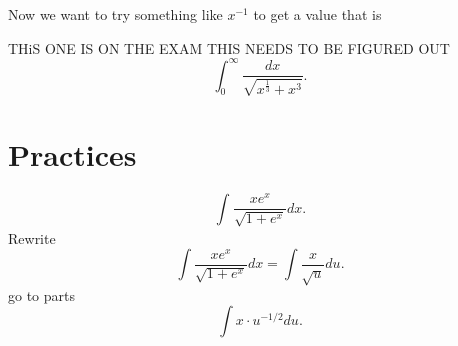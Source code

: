 \documentclass[a4paper]{article}
\begin{document}
Now we want to try something like $x^{-1}$ to get a value that is 

THiS ONE IS ON THE EXAM THIS NEEDS TO BE FIGURED OUT 
\[
\int_{0}^{\infty} \frac{dx}{\sqrt{x^{\frac{1}{3}}+x^3}}
.\] 

\section{Practices}%
\label{sec:Practices}
\[
\int_{}^{} \frac{xe^{x}}{\sqrt{1+e^{x}}}dx
.\] 
Rewrite 
\[
\int \frac{xe^{x}}{\sqrt{1+e^{x}}} dx = \int \frac{x}{\sqrt{u}} du
.\] 
go to parts
\[
\int x \cdot u^{-1/2} du
.\] 
\end{document}
